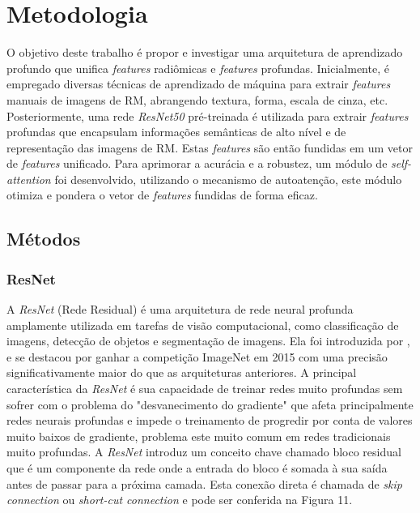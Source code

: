 \chapter{Metodologia} 
\label{chap:metodologia}

O objetivo deste trabalho é propor e investigar uma arquitetura de aprendizado profundo que unifica \textit{features} radiômicas e \textit{features} profundas. Inicialmente, é empregado diversas técnicas de aprendizado de máquina para extrair \textit{features} manuais de imagens de RM, abrangendo textura, forma, escala de cinza, etc. Posteriormente, uma rede \textit{ResNet50} pré-treinada é utilizada para extrair \textit{features} profundas que encapsulam informações semânticas de alto nível e de representação das imagens de \gls{RM}. Estas \textit{features} são então fundidas em um vetor de \textit{features} unificado. Para aprimorar a acurácia e a robustez, um módulo de \textit{self-attention} foi desenvolvido, utilizando o mecanismo de autoatenção, este módulo otimiza e pondera o vetor de \textit{features} fundidas de forma eficaz.

\section{Métodos}
\label{sec:cap4_metodos}

\subsection{ResNet}
\label{subsec:cap4_resnet}

A \textit{ResNet} (Rede Residual) é uma arquitetura de rede neural profunda amplamente utilizada em tarefas de visão computacional, como classificação de imagens, detecção de objetos e segmentação de imagens. Ela foi introduzida por  \cite{heDeepResidualLearning2015}, e se destacou por ganhar a competição ImageNet em 2015 com uma precisão significativamente maior do que as arquiteturas anteriores. A principal característica da \textit{ResNet} é sua capacidade de treinar redes muito profundas sem sofrer com o problema do "desvanecimento do gradiente" que afeta principalmente redes neurais profundas e impede o treinamento de progredir por conta de valores muito baixos de gradiente, problema este muito comum em redes tradicionais muito profundas. A \textit{ResNet} introduz um conceito chave chamado bloco residual que é um componente da rede onde a entrada do bloco é somada à sua saída antes de passar para a próxima camada. Esta conexão direta é chamada de \textit{skip connection} ou \textit{short-cut connection} e pode ser conferida na Figura 11.

